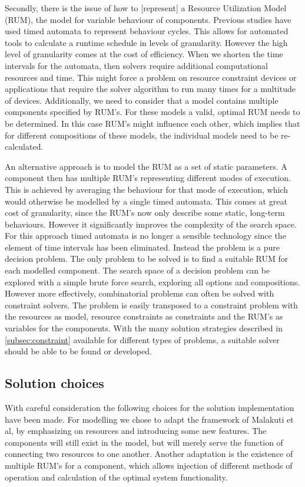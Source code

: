 Secondly, there is the issue of how to [represent] a Resource Utilization Model (RUM)\cite{steven-te-brinke}, the model for variable behaviour of components. Previous studies \cite{rum_basis_89, steven-te-brinke} have used timed automata to represent behaviour cycles. This allows for automated tools to calculate a runtime schedule in levels of granularity. However the high level of granularity comes at the cost of efficiency. When we shorten the time intervals for the automata, then solvers require additional computational resources and time. This might force a problem on resource constraint devices or applications that require the solver algorithm to run many times for a multitude of devices. Additionally, we need to consider that a model contains multiple components specified by RUM's. For these models a valid, optimal RUM needs to be determined. In this case RUM's might influence each other, which implies that for different compositions of these models, the individual models need to be re-calculated. %

An alternative approach is to model the RUM as a set of static parameters. A component then has multiple RUM's representing different modes of execution. This is achieved by averaging the behaviour for that mode of execution, which would otherwise be modelled by a single timed automata. This comes at great cost of granularity, since the RUM's now only describe some static, long-term behaviours. However it significantly improves the complexity of the search space. For this approach timed automata is no longer a sensible technology since the element of time intervals has been eliminated. Instead the problem is a pure decision problem\cite{decision_problem}. The only problem to be solved is to find a suitable RUM for each modelled component. The search space of a decision problem can be explored with a simple brute force search, exploring all options and compositions. However more effectively, combinatorial problems can often be solved with constraint solvers. The problem is easily transposed to a constraint problem with the resources as model, resource constraints as constraints and the RUM's as variables for the components. With the many solution strategies described in \ref{subsec:constraint} available for different types of problems, a suitable solver should be able to be found or developed.

\subsection{Solution choices}
With careful consideration the following choices for the solution implementation have been made. For modelling we chose to adapt the framework of Malakuti et al\cite{steven_te_brinke}, by emphasizing on resources and introducing some new features. The components will still exist in the model, but will merely serve the function of connecting two resources to one another. Another adaptation is the existence of multiple RUM's for a component, which allows injection of different methods of operation and calculation of the optimal system functionality.

